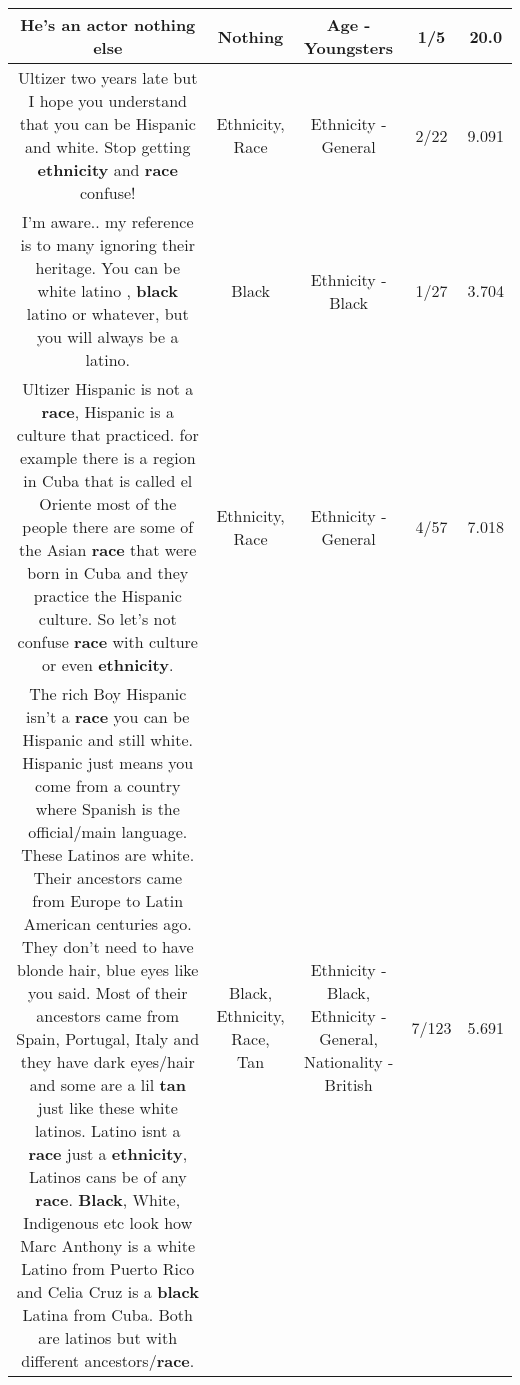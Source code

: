 \documentclass[11pt]{article}
\newlength\mylength
\begin{document}
\begin{center}
\begin{longtable}{|C{.65\mylength}|C{.30\mylength}|C{.12\mylength}|C{.12\mylength}|C{.12\mylength}|}
  \small He's an actor \textbf{nothing} else\normalsize   & Nothing & Age - Youngsters & 1/5 & 20.0 \\  \hline
  \small Ultizer two years late but I hope you understand that you can be Hispanic and white. Stop getting \textbf{ethnicity} and \textbf{race} confuse!\normalsize   & Ethnicity, Race & Ethnicity - General & 2/22 & 9.091 \\  \hline
  \small I'm aware.. my reference is to many ignoring their heritage. You can be white latino , \textbf{black} latino or whatever, but you will always be  a latino.\normalsize   & Black & Ethnicity - Black & 1/27 & 3.704 \\  \hline
  \small Ultizer Hispanic is not a \textbf{race}, Hispanic is a culture that practiced.  for example there is a region in Cuba that is called el Oriente most of the people there are some of the Asian \textbf{race} that were born in Cuba and they practice the Hispanic culture. So let's not confuse \textbf{race} with culture or even \textbf{ethnicity}.\normalsize   & Ethnicity, Race & Ethnicity - General & 4/57 & 7.018 \\  \hline
  \small The rich Boy Hispanic isn't a \textbf{race} you can be Hispanic and still white. Hispanic just means you come from a country where Spanish is the official/main language. These Latinos are white. Their ancestors came from Europe to Latin American centuries ago. They don't need to have blonde hair, blue eyes like you said. Most of their ancestors came from Spain, Portugal, Italy and they have dark eyes/hair and some are a lil \textbf{tan} just like these white latinos. Latino isnt a \textbf{race} just a \textbf{ethnicity}, Latinos cans be of any \textbf{race}. \textbf{Black}, White, Indigenous etc look how Marc Anthony is a white Latino from Puerto Rico and Celia Cruz is a \textbf{black} Latina from Cuba. Both are latinos but with different ancestors/\textbf{race}.\normalsize   & Black, Ethnicity, Race, Tan & Ethnicity - Black, Ethnicity - General, Nationality - British & 7/123 & 5.691 \\  \hline

\end{longtable}
\end{center}
\end{document}
